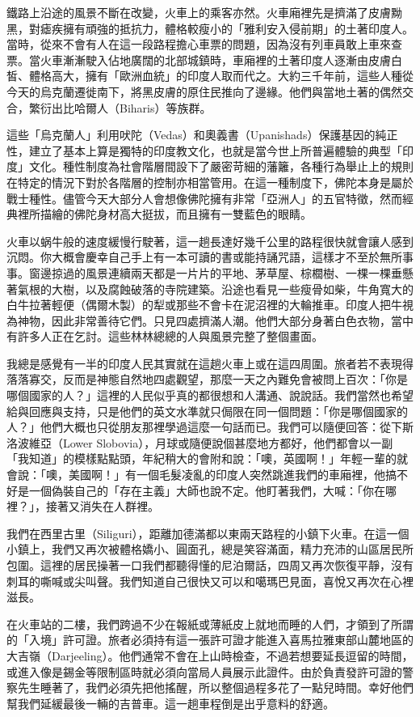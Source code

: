 鐵路上沿途的風景不斷在改變，火車上的乘客亦然。火車廂裡先是擠滿了皮膚黝黑，對瘧疾擁有頑強的抵抗力，體格較瘦小的「雅利安入侵前期」的土著印度人。當時，從來不會有人在這一段路程擔心車票的問題，因為沒有列車員敢上車來查票。當火車漸漸駛入佔地廣闊的北部城鎮時，車廂裡的土著印度人逐漸由皮膚白皙、體格高大，擁有「歐洲血統」的印度人取而代之。大約三千年前，這些人種從今天的烏克蘭遷徙南下，將黑皮膚的原住民推向了邊緣。他們與當地土著的偶然交合，繁衍出比哈爾人（Biharis）等族群。

這些「烏克蘭人」利用吠陀（Vedas）和奧義書（Upanishads）保護基因的純正性，建立了基本上算是獨特的印度教文化，也就是當今世上所普遍體驗的典型「印度」文化。種性制度為社會階層間設下了嚴密苛細的藩籬，各種行為舉止上的規則在特定的情況下對於各階層的控制亦相當管用。在這一種制度下，佛陀本身是屬於戰士種性。儘管今天大部分人會想像佛陀擁有非常「亞洲人」的五官特徵，然而經典裡所描繪的佛陀身材高大挺拔，而且擁有一雙藍色的眼睛。

火車以蜗牛般的速度緩慢行駛著，這一趟長達好幾千公里的路程很快就會讓人感到沉悶。你大概會慶幸自己手上有一本可讀的書或能持誦咒語，這樣才不至於無所事事。窗邊掠過的風景連續兩天都是一片片的平地、茅草屋、棕櫚樹、一棵一棵垂懸著氣根的大樹，以及腐蝕破落的寺院建築。沿途也看見一些瘦骨如柴，牛角寬大的白牛拉著輕便（偶爾木製）的犁或那些不會卡在泥沼裡的大輪推車。印度人把牛視為神物，因此非常善待它們。只見四處擠滿人潮。他們大部分身著白色衣物，當中有許多人正在乞討。這些林林總總的人與風景完整了整個畫面。

我總是感覺有一半的印度人民其實就在這趟火車上或在這四周圍。旅者若不表現得落落寡交，反而是神態自然地四處觀望，那麼一天之內難免會被問上百次：「你是哪個國家的人？」這裡的人民似乎真的都很想和人溝通、說說話。我們當然也希望給與回應與支持，只是他們的英文水準就只侷限在同一個問題：「你是哪個國家的人？」他們大概也只從朋友那裡學過這麼一句話而已。我們可以隨便回答：從下斯洛波維亞（Lower
Slobovia），月球或隨便說個甚麼地方都好，他們都會以一副「我知道」的模樣點點頭，年紀稍大的會附和說：「噢，英國啊！」年輕一輩的就會說：「噢，美國啊！」有一個毛髮凌亂的印度人突然跳進我們的車廂裡，他搞不好是一個偽裝自己的「存在主義」大師也說不定。他盯著我們，大喊：「你在哪裡？」，接著又消失在人群裡。

我們在西里古里（Siliguri），距離加德滿都以東兩天路程的小鎮下火車。在這一個小鎮上，我們又再次被體格嬌小、圓面孔，總是笑容滿面，精力充沛的山區居民所包圍。這裡的居民操著一口我們都聽得懂的尼泊爾話，四周又再次恢復平靜，沒有刺耳的嘶喊或尖叫聲。我們知道自己很快又可以和噶瑪巴見面，喜悅又再次在心裡滋長。

在火車站的二樓，我們跨過不少在報紙或薄紙皮上就地而睡的人們，才領到了所謂的「入境」許可證。旅者必須持有這一張許可證才能進入喜馬拉雅東部山麓地區的大吉嶺（Darjeeling）。他們通常不會在上山時檢查，不過若想要延長逗留的時間，或進入像是錫金等限制區時就必須向當局人員展示此證件。由於負責發許可證的警察先生睡著了，我們必須先把他搖醒，所以整個過程多花了一點兒時間。幸好他們幫我們延緩最後一輛的吉普車。這一趟車程倒是出乎意料的舒適。

